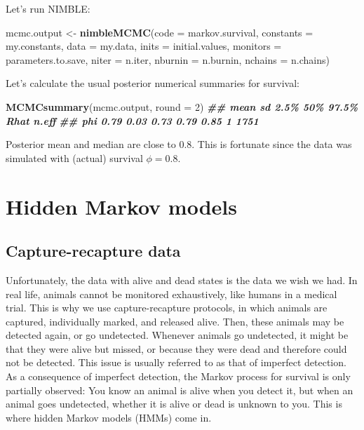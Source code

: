 \documentclass[
  12pt,
]{krantz}
\newenvironment{Shaded}{\begin{snugshade}}{\end{snugshade}}
\newcommand{\AttributeTok}[1]{\textcolor[rgb]{0.13,0.29,0.53}{#1}}
\newcommand{\DecValTok}[1]{\textcolor[rgb]{0.00,0.00,0.81}{#1}}
\newcommand{\DocumentationTok}[1]{\textcolor[rgb]{0.56,0.35,0.01}{\textbf{\textit{#1}}}}
\newcommand{\FunctionTok}[1]{\textcolor[rgb]{0.13,0.29,0.53}{\textbf{#1}}}
\newcommand{\NormalTok}[1]{#1}
\newcommand{\OtherTok}[1]{\textcolor[rgb]{0.56,0.35,0.01}{#1}}
\begin{document}
Let's run NIMBLE:

\begin{Shaded}
\begin{Highlighting}[]
\NormalTok{mcmc.output }\OtherTok{\textless{}{-}} \FunctionTok{nimbleMCMC}\NormalTok{(}\AttributeTok{code =}\NormalTok{ markov.survival,}
                          \AttributeTok{constants =}\NormalTok{ my.constants,}
                          \AttributeTok{data =}\NormalTok{ my.data,}
                          \AttributeTok{inits =}\NormalTok{ initial.values,}
                          \AttributeTok{monitors =}\NormalTok{ parameters.to.save,}
                          \AttributeTok{niter =}\NormalTok{ n.iter,}
                          \AttributeTok{nburnin =}\NormalTok{ n.burnin,}
                          \AttributeTok{nchains =}\NormalTok{ n.chains)}
\end{Highlighting}
\end{Shaded}

Let's calculate the usual posterior numerical summaries for survival:

\begin{Shaded}
\begin{Highlighting}[]
\FunctionTok{MCMCsummary}\NormalTok{(mcmc.output, }\AttributeTok{round =} \DecValTok{2}\NormalTok{)}
\DocumentationTok{\#\#     mean   sd 2.5\%  50\% 97.5\% Rhat n.eff}
\DocumentationTok{\#\# phi 0.79 0.03 0.73 0.79  0.85    1  1751}
\end{Highlighting}
\end{Shaded}

Posterior mean and median are close to \(0.8\). This is fortunate since the data was simulated with (actual) survival \(\phi = 0.8\).

\section{Hidden Markov models}\label{hidden-markov-models}

\subsection{Capture-recapture data}\label{capturerecapturedata}

\begin{blackbox}
Unfortunately, the data with alive and dead states is the data we wish we had. In real life, animals cannot be monitored exhaustively, like humans in a medical trial. This is why we use capture-recapture protocols, in which animals are captured, individually marked, and released alive. Then, these animals may be detected again, or go undetected. Whenever animals go undetected, it might be that they were alive but missed, or because they were dead and therefore could not be detected. This issue is usually referred to as that of imperfect detection. As a consequence of imperfect detection, the Markov process for survival is only partially observed: You know an animal is alive when you detect it, but when an animal goes undetected, whether it is alive or dead is unknown to you. This is where hidden Markov models (HMMs) come in.

\end{blackbox}
\end{document}
